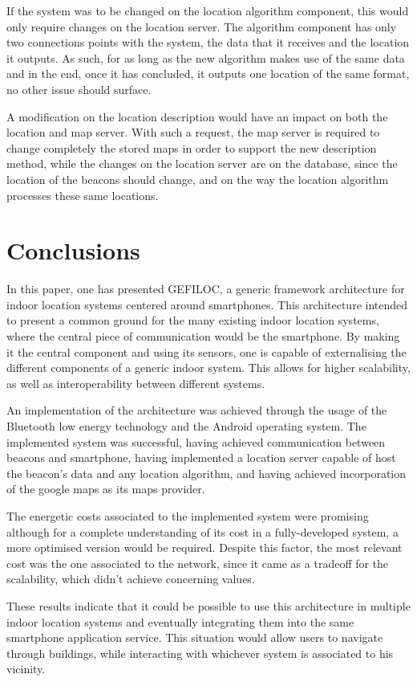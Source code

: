 \documentclass[a4paper]{IEEEtran}
\begin{document}
 
If the system was to be changed on the location algorithm component, this would only require changes on the location server. The algorithm component has only two connections points with the system, the data that it receives and the location it outputs. As such, for as long as the new algorithm makes use of the same data and in the end, once it has concluded, it outputs one location of the same format, no other issue should surface. 
 
 
A modification on the location description would have an impact on both the location and map server. With such a request, the map server is required to change completely the stored maps in order to support the new description method, while the changes on the location server are on the database, since the location of the beacons should change, and on the way the location algorithm processes these same locations.   
 
 
\section{Conclusions} 
\label{sec:conclusions} 
 
 
In this paper, one has presented GEFILOC, a generic framework architecture for indoor location systems centered around smartphones. This architecture intended to present a common ground for the many existing indoor location systems, where the central piece of communication would be the smartphone. By making it the central component and using its sensors, one is capable of externalising the different components of a generic indoor system. This allows for higher scalability, as well as interoperability between different systems. 
 
 
An implementation of the architecture was achieved through the usage of the Bluetooth low energy technology and the Android operating system. The implemented system was successful, having achieved communication between beacons and smartphone, having implemented a location server capable of host the beacon's data and any location algorithm, and having achieved incorporation of the google maps as its maps provider. 
 
 
The energetic costs associated to the implemented system were promising although for a complete understanding of its cost in a fully-developed system, a more optimised version would be required. Despite this factor, the most relevant cost was the one associated to the network, since it came as a tradeoff for the scalability, which didn't achieve concerning values. 
 
 
These results indicate that it could be possible to use this architecture in multiple indoor location systems and eventually integrating them into the same smartphone application service. This situation would allow users to navigate through buildings, while interacting with whichever system is associated to his vicinity. 
 
 
 
 
 
 
\end{document}
